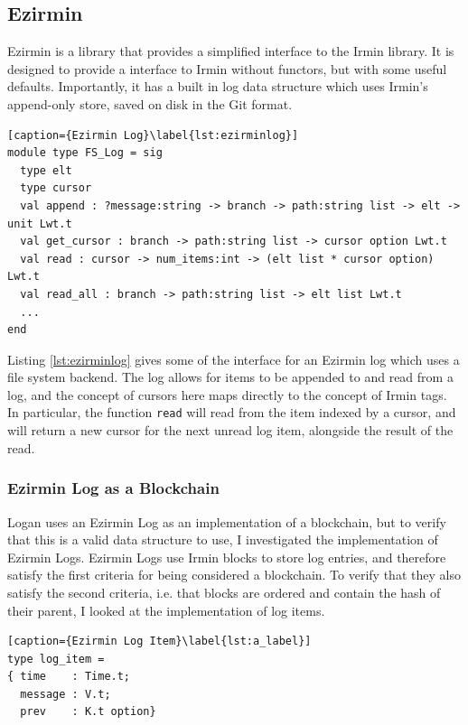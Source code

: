\documentclass[12pt,a4paper,twoside,openright]{report}
\begin{document}
	\subsection{Ezirmin}
	Ezirmin is a library that provides a simplified interface to the Irmin library. 
	It is designed to provide a interface to Irmin without functors, but with some useful defaults. 
	Importantly, it has a built in log data structure which uses Irmin's append-only store, saved on disk in the Git format.\\
	\begin{lstlisting}[caption={Ezirmin Log}\label{lst:ezirminlog}]
module type FS_Log = sig
  type elt 
  type cursor 
  val append : ?message:string -> branch -> path:string list -> elt -> unit Lwt.t
  val get_cursor : branch -> path:string list -> cursor option Lwt.t
  val read : cursor -> num_items:int -> (elt list * cursor option) Lwt.t
  val read_all : branch -> path:string list -> elt list Lwt.t
  ...
end
	\end{lstlisting}
	Listing \ref{lst:ezirminlog} gives some of the interface for an Ezirmin log which uses a file system backend.
	The log allows for items to be appended to and read from a log, and the concept of cursors here maps directly to the concept of Irmin tags.
	In particular, the function \texttt{read} will read from the item indexed by a cursor, and will return a new cursor for the next unread log item, alongside the result of the read.

	\subsubsection*{Ezirmin Log as a Blockchain}
	Logan uses an Ezirmin Log as an implementation of a blockchain, but to verify that this is a valid data structure to use, I investigated the implementation of Ezirmin Logs.
	Ezirmin Logs use Irmin blocks to store log entries, and therefore satisfy the first criteria for being considered a blockchain. 
	To verify that they also satisfy the second criteria, i.e. that blocks are ordered and contain the hash of their parent, I looked at the implementation of log items.

	\begin{lstlisting}[caption={Ezirmin Log Item}\label{lst:a_label}]
type log_item =
{ time    : Time.t;
  message : V.t;
  prev    : K.t option}
	\end{lstlisting}
\end{document}
